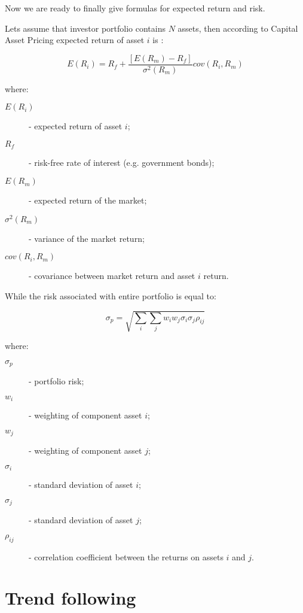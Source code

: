 Now we are ready to finally give formulas for expected return and risk.

Lets assume that investor portfolio contains $N$ assets, then according to Capital Asset Pricing expected return of asset $i$ is \cite{CAPM}: 

\begin{equation}
\label{first_eq}
 E(R_{i})  = R_{f} + \frac{ [E(R_{m}) - R_{f}]} {\sigma^2(R_{m})} cov(R_{i}, R_{m})
\end{equation} 

where:
\begin{description}
  \item [$E(R_{i})$]
    - expected return of asset $i$;
  \item [$R_{f}$]
    - risk-free rate of interest (e.g. government bonds);
  \item [$E(R_{m})$]
    - expected return of the market;
  \item [$\sigma^2(R_{m})$]
    - variance of the market return;
  \item [$cov(R_{i}, R_{m})$]
    - covariance between market return and asset $i$ return.
\end{description}

While the risk associated with entire portfolio is equal to:

\begin{equation}
\label{sec_eq}
 \sigma_{p}  = \sqrt{\sum_{i} \sum_{j} w_{i}w_{j} \sigma_{i} \sigma_{j} \rho_{ij}}
\end{equation} 

where:

\begin{description}
  \item [$\sigma_{p}$]
    - portfolio risk;
  \item [$w_{i}$]
    - weighting of component asset $i$;
  \item [$w_{j}$]
    - weighting of component asset $j$;
  \item [$\sigma_{i}$]
    - standard deviation of asset $i$;
  \item [$\sigma_{j}$]
    - standard deviation of asset $j$;
  \item [$\rho_{ij}$]
    - correlation coefficient between the returns on assets $i$ and $j$.
\end{description}
 

\section{Trend following}
\label{sec:trendFollowing}

